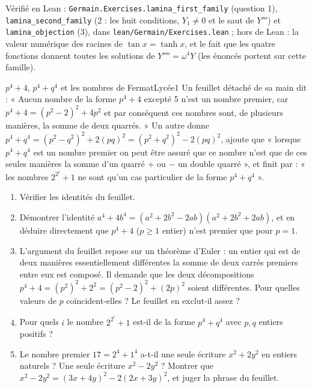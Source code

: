 \documentclass[11pt,a4paper]{article}
\begin{document}
\begin{solution}
Vérifié en Lean : \texttt{Germain.Exercises.lamina\_first\_family} (question 1),
\texttt{lamina\_second\_family} (2 : les huit conditions, $Y_1 \neq 0$ et le saut
de $Y'''$) et \texttt{lamina\_objection} (3), dans \texttt{lean/Germain/Exercises.lean} ; hors de Lean : la
valeur numérique des racines de $\tan x = \tanh x$, et le fait que les quatre fonctions
donnent toutes les solutions de $Y'''' = \omega^4Y$ (les énoncés portent sur cette
famille).
\end{solution}

\begin{exercice}{$p^4 + 4$, $p^4 + q^4$ et les nombres de Fermat}{Lycée}{1}
Un feuillet détaché de sa main dit : « Aucun nombre de la forme $p^4 + 4$ excepté 5
n'est un nombre premier, car $p^4 + 4 = (p^2 - 2)^2 + 4p^2$ et par conséquent ces
nombres sont, de plusieurs manières, la somme de deux quarrés. » Un autre
donne $p^4 + q^4 = (p^2 - q^2)^2 + 2(pq)^2 = (p^2+q^2)^2 - 2(pq)^2$, ajoute que
« lorsque $p^4+q^4$ est un nombre premier on peut être assuré que ce nombre n'est que de
ces seules manières la somme d'un quarré $+$ ou $-$ un double quarré », et finit par :
« les nombres $2^{2^i} + 1$ ne sont qu'un cas particulier de la forme $p^4 + q^4$ ».
\begin{enumerate}
\item Vérifier les identités du feuillet.
\item Démontrer l'identité $a^4 + 4b^4 = (a^2 + 2b^2 - 2ab)(a^2 + 2b^2 + 2ab)$, et en
  déduire directement que $p^4 + 4$ ($p \ge 1$ entier) n'est premier que pour $p = 1$.
\item L'argument du feuillet repose sur un théorème d'Euler : un entier qui est de
  deux manières essentiellement différentes la somme de deux carrés premiers entre
  eux est composé. Il demande que les deux
  décompositions $p^4 + 4 = (p^2)^2 + 2^2 = (p^2 - 2)^2 + (2p)^2$ soient
  différentes. Pour quelles valeurs de $p$ coïncident-elles ? Le feuillet en
  exclut-il assez ?
\item Pour quels $i$ le nombre $2^{2^i} + 1$ est-il de la forme $p^4 + q^4$ avec
  $p, q$ entiers positifs ?
\item Le nombre premier $17 = 2^4 + 1^4$ a-t-il une seule écriture $x^2 + 2y^2$ en
  entiers naturels ? Une seule écriture $x^2 - 2y^2$ ? Montrer que
  $x^2 - 2y^2 = (3x + 4y)^2 - 2(2x + 3y)^2$, et juger la phrase du feuillet.
\end{enumerate}
\end{exercice}
\end{document}
